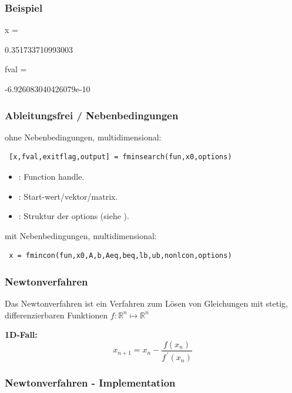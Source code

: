 \documentclass[hyperref={xetex}]{beamer}
\begin{document}
\begin{frame}[fragile]\frametitle{Beispiel}

\begin{matlab}
x =

   0.351733710993003

fval =

    -6.926083040426079e-10
\end{matlab}

\end{frame}

\begin{frame}[fragile]\frametitle{Ableitungsfrei / Nebenbedingungen}
ohne Nebenbedingungen, multidimensional:
\begin{lstlisting}
 [x,fval,exitflag,output] = fminsearch(fun,x0,options)
\end{lstlisting}
\begin{itemize}
 \item {}: Function handle.
\item {}: Start-wert/vektor/matrix.
\item {}: Struktur der options (siehe ).
\end{itemize}

mit Nebenbedingungen, multidimensional:
\begin{lstlisting}
 x = fmincon(fun,x0,A,b,Aeq,beq,lb,ub,nonlcon,options)
\end{lstlisting}

\end{frame}

\begin{frame}[fragile]\frametitle{Newtonverfahren}

Das Newtonverfahren ist ein Verfahren zum Lösen von Gleichungen mit stetig, differenzierbaren 
Funktionen $f:\mathbb{R}^n \mapsto \mathbb{R}^n$

\textbf{1D-Fall:}
\[
 x_{n+1} = x_n - \frac{f(x_n)}{f^{\,\prime}(x_n)}
\]

\end{frame}

\begin{frame}[fragile]\frametitle{Newtonverfahren - Implementation}

\end{frame}
\end{document}
